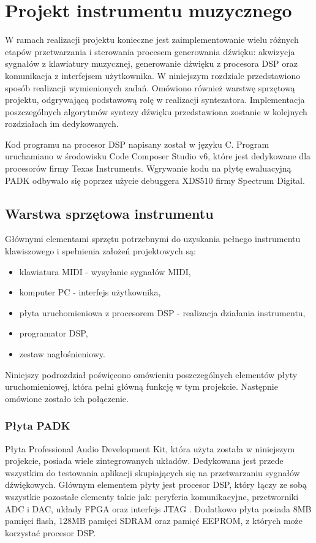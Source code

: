 \chapter{Projekt instrumentu muzycznego}
W ramach realizacji projektu konieczne jest zaimplementowanie wielu różnych etapów przetwarzania i sterowania procesem generowania dźwięku: akwizycja sygnałów z klawiatury muzycznej, generowanie dźwięku z procesora DSP oraz komunikacja z interfejsem użytkownika. W niniejszym rozdziale przedstawiono sposób realizacji wymienionych zadań. Omówiono również warstwę sprzętową projektu, odgrywającą podstawową rolę w realizacji syntezatora. Implementacja poszczególnych algorytmów syntezy dźwięku przedstawiona zostanie w kolejnych rozdziałach im dedykowanych.

Kod programu na procesor DSP napisany został w języku C. Program uruchamiano w środowisku Code Composer Studio v6, które jest dedykowane dla procesorów firmy Texas Instruments. Wgrywanie kodu na płytę ewaluacyjną PADK odbywało się poprzez użycie debuggera XDS510 firmy Spectrum Digital.


\section{Warstwa sprzętowa instrumentu}
Głównymi elementami sprzętu potrzebnymi do uzyskania pełnego instrumentu klawiszowego i spełnienia założeń projektowych są:
\begin{itemize}
	\item klawiatura MIDI - wysyłanie sygnałów MIDI,
	\item komputer PC - interfejs użytkownika,
	\item płyta uruchomieniowa z procesorem DSP - realizacja działania instrumentu,
	\item programator DSP,
	\item zestaw nagłośnieniowy.
\end{itemize}

Niniejszy podrozdział poświęcono omówieniu poszczególnych elementów płyty uruchomieniowej, która pełni główną funkcję w tym projekcie. Następnie omówione zostało ich połączenie.

\subsection{Płyta PADK}
Płyta Professional Audio Development Kit, która użyta została w niniejszym projekcie, posiada wiele zintegrowanych układów. Dedykowana jest przede wszystkim do testowania aplikacji skupiających się na przetwarzaniu sygnałów dźwiękowych. Głównym elementem płyty jest procesor DSP, który łączy ze sobą wszystkie pozostałe elementy takie jak: peryferia komunikacyjne, przetworniki ADC i DAC, układy FPGA oraz interfejs JTAG \cite{dokumentacja_PADK}. Dodatkowo płyta posiada 8MB pamięci flash, 128MB pamięci SDRAM oraz pamięć EEPROM, z których może korzystać procesor DSP.


